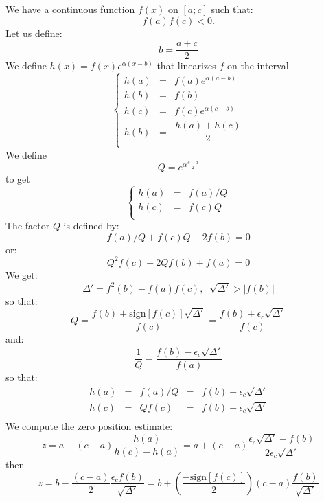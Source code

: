 \documentclass[aps,12pt]{revtex4}
\begin{document}
We have a continuous function $f(x)$ on $[a;c]$ such that:
$$f(a)f(c)<0.$$
Let us define:
$$
	b = \dfrac{a+c}{2}
$$
We define $h(x)=f(x)e^{\alpha(x-b)}$ that linearizes $f$ on the interval.
$$
\left\lbrace
\begin{array}{rcl}
	h(a) & = & f(a)e^{\alpha(a-b)}\\
	h(b) & = & f(b)\\
	h(c) & = & f(c) e^{\alpha(c-b)}\\
	h(b) & = & \dfrac{h(a)+h(c)}{2}\\
\end{array}
\right.
$$
We define
$$
Q = e^{\alpha\frac{c-a}{2}}
$$
to get
$$	
\left\lbrace
\begin{array}{rcl}
	h(a) & = & f(a)/Q\\
 	h(c) & = & f(c)Q\\
\end{array}
\right.
$$
The factor $Q$ is defined by:
$$
	f(a)/Q + f(c)Q - 2f(b) = 0
$$
or:
$$
	Q^2 f(c) - 2Qf(b) + f(a) = 0 
$$
We get:
$$
	\Delta' = f^2(b) - f(a)f(c), \;\; \sqrt{\Delta'} > |f(b)|
$$
so that:
$$
	Q = \dfrac{f(b) + \mathrm{sign}[ f(c) ] \sqrt{\Delta'}}{f(c)} = \dfrac{f(b) + \epsilon_c \sqrt{\Delta'}}{f(c)}
$$
and:
$$
	\dfrac{1}{Q} = \frac{f(b) - \epsilon_c \sqrt{\Delta'}}{f(a)}
$$
so that:
$$
\begin{array}{rcccl}
	h(a) & = & f(a)/Q & = & f(b) - \epsilon_c \sqrt{\Delta'}\\
	h(c) & = & Qf(c)  & = & f(b) + \epsilon_c \sqrt{\Delta'}\\
\end{array}
$$
We compute the zero position estimate:
$$
	z = a - (c-a) \dfrac{h(a)}{h(c)-h(a)} = a + (c-a) \dfrac{\epsilon_c \sqrt{\Delta'} - f(b)}{2 \epsilon_c \sqrt{\Delta'}}
$$
then
$$
	z = b - \dfrac{(c-a)}{2} \dfrac{\epsilon_c f(b)}{\sqrt{\Delta'}} = b + \left(\dfrac{-\mathrm{sign}[ f(c) ]}{2}\right) (c-a) \dfrac{f(b)}{\sqrt{\Delta'}}
$$
 
\end{document}
